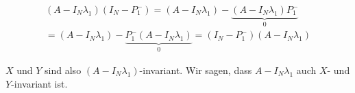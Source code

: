 \begin{remark}
    \begin{multline*}
        (A - I_N \lambda_1) (I_N - P_1^-)
        =
        (A - I_N \lambda_1) - \underbrace{(A - I_N \lambda_1) P_1^-}_0 \\
        =
        (A - I_N \lambda_1) - \underbrace{P_1^- (A - I_N \lambda_1)}_0
        =
        (I_N - P_1^-) (A - I_N \lambda_1)
    \end{multline*}

    $X$ und $Y$ sind also $(A - I_N \lambda_1)$-invariant.
    Wir sagen, dass $A - I_N \lambda_1$ auch $X$- und $Y$-invariant ist.

\end{remark}
